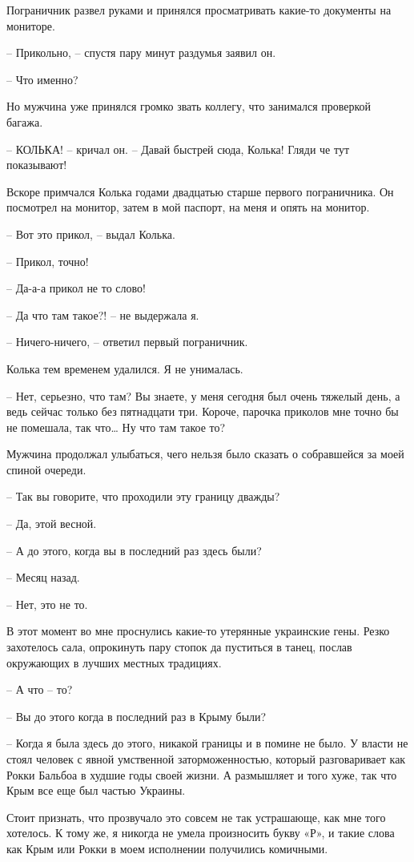 \documentclass[
]{book}
\begin{document}
Пограничник развел руками и принялся просматривать какие-то документы на мониторе.

-- Прикольно, -- спустя пару минут раздумья заявил он.

-- Что именно?

Но мужчина уже принялся громко звать коллегу, что занимался проверкой багажа.

-- КОЛЬКА! -- кричал он. -- Давай быстрей сюда, Колька! Гляди че тут показывают!

Вскоре примчался Колька годами двадцатью старше первого пограничника. Он посмотрел на монитор, затем в мой паспорт, на меня и опять на монитор.

-- Вот это прикол, -- выдал Колька.

-- Прикол, точно!

-- Да-а-а прикол не то слово!

-- Да что там такое?! -- не выдержала я.

-- Ничего-ничего, -- ответил первый пограничник.

Колька тем временем удалился. Я не унималась.

-- Нет, серьезно, что там? Вы знаете, у меня сегодня был очень тяжелый день, а ведь сейчас только без пятнадцати три. Короче, парочка приколов мне точно бы не помешала, так что\ldots{} Ну что там такое то?

Мужчина продолжал улыбаться, чего нельзя было сказать о собравшейся за моей спиной очереди.

-- Так вы говорите, что проходили эту границу дважды?

-- Да, этой весной.

-- А до этого, когда вы в последний раз здесь были?

-- Месяц назад.

-- Нет, это не то.

В этот момент во мне проснулись какие-то утерянные украинские гены. Резко захотелось сала, опрокинуть пару стопок да пуститься в танец, послав окружающих в лучших местных традициях.

-- А что -- то?

-- Вы до этого когда в последний раз в Крыму были?

-- Когда я была здесь до этого, никакой границы и в помине не было. У власти не стоял человек с явной умственной заторможенностью, который разговаривает как Рокки Бальбоа в худшие годы своей жизни. А размышляет и того хуже, так что Крым все еще был частью Украины.

Стоит признать, что прозвучало это совсем не так устрашающе, как мне того хотелось. К тому же, я никогда не умела произносить букву «Р», и такие слова как Крым или Рокки в моем исполнении получились комичными.
\end{document}
